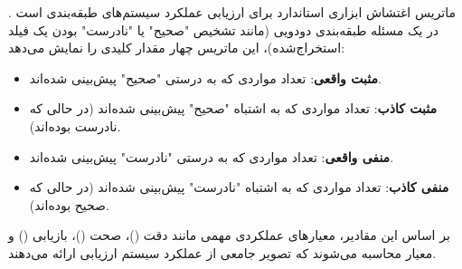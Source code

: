 
ماتریس اغتشاش ابزاری استاندارد برای ارزیابی عملکرد سیستم‌های طبقه‌بندی است \cite{powers2011evaluation}. در یک مسئله طبقه‌بندی دودویی (مانند تشخیص "صحیح" یا "نادرست" بودن یک فیلد استخراج‌شده)، این ماتریس چهار مقدار کلیدی را نمایش می‌دهد:
\begin{itemize}
	\item \textbf{مثبت واقعی}: تعداد مواردی که به درستی "صحیح" پیش‌بینی شده‌اند.
	\item \textbf{مثبت کاذب}: تعداد مواردی که به اشتباه "صحیح" پیش‌بینی شده‌اند (در حالی که نادرست بوده‌اند).
	\item \textbf{منفی واقعی}: تعداد مواردی که به درستی "نادرست" پیش‌بینی شده‌اند.
	\item \textbf{منفی کاذب}: تعداد مواردی که به اشتباه "نادرست" پیش‌بینی شده‌اند (در حالی که صحیح بوده‌اند).
\end{itemize}
بر اساس این مقادیر، معیارهای عملکردی مهمی مانند دقت ()، صحت ()، بازیابی () و معیار  محاسبه می‌شوند که تصویر جامعی از عملکرد سیستم ارزیابی ارائه می‌دهند.

